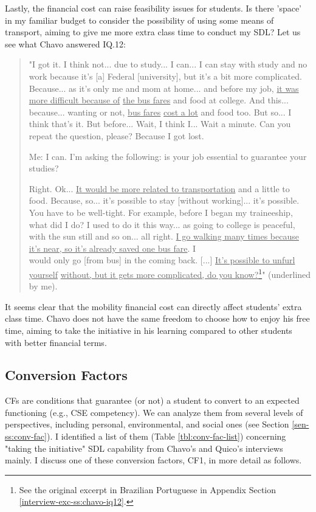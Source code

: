 Lastly, the financial cost can raise feasibility issues for students. Is there 'space' in my familiar budget to consider the possibility of using some means of transport, aiming to give me more extra class time to conduct my \gls{SDL}? Let us see what Chavo answered \gls{IQ}.12:
\begin{quote}
    "I got it. I think not... due to study... I can... I can stay with study and no work because it's [a] Federal [university], but it's a bit more complicated. Because... as it's only me and mom at home... and before my job, \underline{it was more difficult because of} \underline{the bus fares} and food at college. And this... because... wanting or not, \underline{bus fares} \underline{cost a lot} and food too. But so... I think that's it. But before... Wait, I think I... Wait a minute. Can you repeat the question, please? Because I got lost.

    \colorbox{black!15}{Me: I can. I'm asking the following: is your job essential to guarantee your studies?}

    Right. Ok... \underline{It would be more related to transportation} and a little to food. Because, so... it's possible to stay [without working]... it's possible. You have to be well-tight. For example, before I began my traineeship, what did I do? I used to do it this way... as going to college is peaceful, with the sun still and so on... all right. \underline{I go walking many times because it's near, so it's already saved one bus fare}. I\\ would only go [from bus] in the coming back. [...] \underline{It's possible to unfurl yourself} \underline{without, but it gets more complicated, do you know?}\footnote{See the original excerpt in Brazilian Portuguese in Appendix Section \ref{interview-exc-ss:chavo-iq12}.}" (underlined by me).
\end{quote}
It seems clear that the mobility financial cost can directly affect students' extra class time. Chavo does not have the same freedom to choose how to enjoy his free time, aiming to take the initiative in his learning compared to other students with better financial terms. 

\subsection{Conversion Factors}
\label{disc-ss:conversion-factors}

\glspl{CF} are conditions that guarantee (or not) a student to convert  to an expected functioning (e.g., \gls{CSE} competency). We can analyze them from several levels of perspectives, including personal, environmental, and social ones (see Section \ref{sen-ss:conv-fac}). I identified a list of them (Table \ref{tbl:conv-fac-list}) concerning "taking the initiative" \gls{SDL} capability from Chavo's and Quico's interviews mainly. I discuss one of these conversion factors, \gls{CF}1, in more detail as follows.

